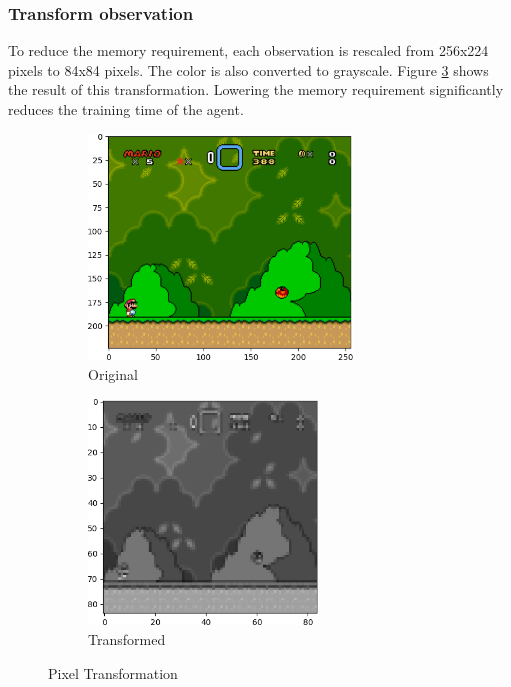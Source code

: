 \documentclass{article}
\begin{document}
    \subsubsection{Transform observation}
    To reduce the memory requirement, each observation is rescaled from 256x224 pixels to 84x84 pixels.
    The color is also converted to grayscale.
    Figure \ref{fig:transformation} shows the result of this transformation.
    Lowering the memory requirement significantly reduces the training time of the agent.
    \begin{figure}[ht]
        \centering
        \begin{subfigure}{.5\textwidth}
            \centering
            \includegraphics[height=6cm]{original_crop}
            \caption{Original}
            \label{fig:sub1}
        \end{subfigure}%
        \begin{subfigure}{.5\textwidth}
            \centering
            \includegraphics[height=6cm]{grayscale_crop}
            \caption{Transformed}
            \label{fig:sub2}
        \end{subfigure}
        \caption{Pixel Transformation}
        \label{fig:transformation}
    \end{figure}
\end{document}
